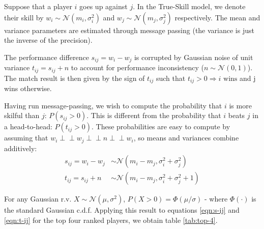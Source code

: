 \documentclass[]{article}
\newcommand{\Ncal}{\mathcal{N}}
\newcommand{\indep}{\perp \!\!\! \perp}
\begin{document}
Suppose that a player $i$ goes up against $j$. In the True-Skill model, we denote their skill by $w_i \sim \Ncal(m_i, \sigma_i^2)$ and $w_j \sim \Ncal(m_j, \sigma_j^2)$ respectively. The mean and variance parameters are estimated through message passing (the variance is just the inverse of the precision). 

The performance difference $s_{ij} = w_i - w_j$ is corrupted by Gaussian noise of unit variance $t_{ij} = s_{ij} + n$ to account for performance inconsistency ($n \sim \Ncal(0, 1)$). The match result is then given by the sign of $t_{ij}$ such that $t_{ij} > 0 \Rightarrow i \text{ wins}$ and j wins otherwise.

Having run message-passing, we wish to compute the probability that $i$ is more skilful than $j$: $P(s_{ij} > 0)$. This is different from the probability that $i$ beats $j$ in a head-to-head: $P(t_{ij} > 0)$. These probabilities are easy to compute by assuming that $w_i \indep w_j \indep n \indep w_i$, so means and variances combine additively:
%
\begin{align}
		s_{ij} = w_i - w_j &\sim \Ncal(m_i - m_j, \sigma_i^2 + \sigma_j^2)
		\label{eqn:s-ij} \\	
		t_{ij} = s_{ij} + n &\sim \Ncal(m_i - m_j, \sigma_i^2 + \sigma_j^2 + 1)
		\label{eqn:t-ij}
\end{align}

For any Gaussian r.v. $X \sim \Ncal(\mu, \sigma^2)$, $P(X > 0) = \Phi(\mu / \sigma)$ - where $\Phi(\cdot)$ is the standard Gaussian c.d.f. Applying this result to equations \ref{eqn:s-ij} and \ref{eqn:t-ij} for the top four ranked players, we obtain table \ref{tab:top-4}.
\end{document}
